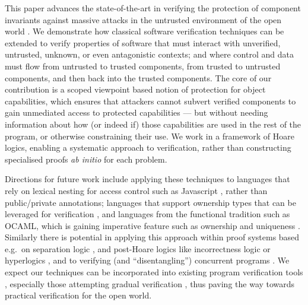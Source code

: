 
This paper advances the state-of-the-art in verifying the protection
of component invariants against massive
attacks \cite{massive-attack-protection} in the untrusted environment
of the open world \cite{baresi2006toward,swapsies}.
%
We demonstrate how classical software verification techniques
can be extended to verify properties of software that must
interact with unverified, untrusted, unknown, or even antagonistic
contexts; and where control and data must flow from untrusted to
trusted components, from trusted to untrusted components, and then
back into the trusted components.
%
The core of our contribution is a scoped viewpoint based notion of
protection for object capabilities, which ensures that attackers
cannot subvert verified components to gain unmediated access to
protected capabilities --- but without needing information about how (or
indeed if) those capabilities are used in the rest of the program, or
otherwise constraining their use.  We work in a framework of Hoare
logics, enabling a systematic approach to
verification, rather than constructing specialised proofs \textit{ab
initio} for each problem. 


Directions for future work include applying these techniques to
languages that rely on lexical nesting for access
control such as Javascript \cite{ooToSecurity},
rather than public/private annotations;
languages that support ownership types that can be leveraged for
verification
\cite{leveragingRust-oopsla2019,RustHornBelt-pldi2022,verus-oopsla2023},
and languages from the
functional tradition such as OCAML, which is gaining imperative
feature such as ownership and uniqueness \cite{funk-ownership-oopsla2024,ocaml-ownership-icfp2024}. 
%
Similarly there is potential in applying this approach within
proof systems based e.g.\ on separation logic \cite{cerise-jacm2024},
and post-Hoare logics like incorrectness logic \cite{IncorrectnessLogic} or
hyperlogics \cite{compositional-hypersafety-oopsla2022,hyper-hoare-pldi2024},
and to verifying (and ``disentangling'') concurrent programs \cite{seplog-disentanglelment-popl2024}.
%
We expect our techniques can be incorporated into existing program
verification tools \cite{Cok2022}, especially those attempting
gradual verification \cite{gradual-verification-popl2024},
thus paving the way towards practical verification for
the open world.






